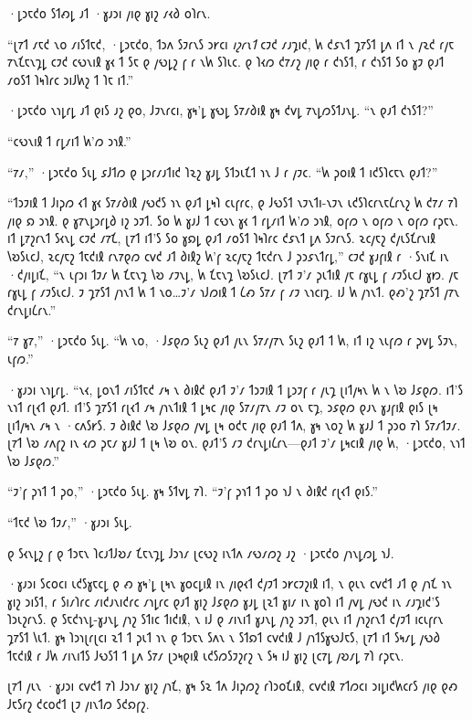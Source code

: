 ·𐑛𐑮𐑱𐑒𐑴 𐑕𐑑𐑺𐑛 𐑨𐑑 ·𐑣𐑨𐑮𐑦 𐑢𐑦𐑞 𐑣𐑦𐑟 𐑥𐑬𐑔 𐑴𐑐𐑩𐑯.

“𐑚𐑳𐑑 𐑥𐑱𐑒 𐑯𐑴 𐑥𐑦𐑕𐑑𐑱𐑒, ·𐑛𐑮𐑱𐑒𐑴, 𐑑𐑮𐑵 𐑕𐑲𐑩𐑯𐑕 𐑮𐑾𐑤𐑦 \emph{𐑦𐑟𐑩𐑯𐑑} 𐑤𐑲𐑒 𐑥𐑨𐑡𐑦𐑒, 𐑿 𐑒𐑭𐑯𐑑 𐑡𐑳𐑕𐑑 𐑛𐑵 𐑦𐑑 𐑯 𐑢𐑷𐑒 𐑩𐑢𐑱 𐑳𐑯𐑗𐑱𐑯𐑡𐑛 𐑤𐑲𐑒 𐑤𐑻𐑯𐑦𐑙 𐑣𐑬 𐑑 𐑕𐑱 𐑞 𐑢𐑻𐑛𐑟 𐑝 𐑩 𐑯𐑿 𐑕𐑐𐑧𐑤. 𐑞 𐑐𐑬𐑼 𐑒𐑳𐑥𐑟 𐑢𐑦𐑞 𐑩 𐑒𐑪𐑕𐑑, 𐑩 𐑒𐑪𐑕𐑑 𐑕𐑴 𐑣𐑲 𐑞𐑨𐑑 𐑥𐑴𐑕𐑑 𐑐𐑰𐑐𐑩𐑤 𐑮𐑦𐑓𐑿𐑟 𐑑 𐑐𐑱 𐑦𐑑.”

·𐑛𐑮𐑱𐑒𐑴 𐑯𐑪𐑛𐑩𐑛 𐑨𐑑 𐑞𐑦𐑕 𐑨𐑟 𐑞𐑴, 𐑓𐑲𐑯𐑩𐑤𐑦, 𐑣𐑰'𐑛 𐑣𐑻𐑛 𐑕𐑳𐑥𐑔𐑦𐑙 𐑣𐑰 𐑒𐑫𐑛 𐑳𐑯𐑛𐑼𐑕𐑑𐑨𐑯𐑛. “𐑯 𐑞𐑨𐑑 𐑒𐑪𐑕𐑑?”

“𐑤𐑻𐑯𐑦𐑙 𐑑 𐑩𐑛𐑥𐑦𐑑 𐑿'𐑼 𐑮𐑪𐑙.”

“𐑳𐑥,” ·𐑛𐑮𐑱𐑒𐑴 𐑕𐑧𐑛 𐑭𐑓𐑑𐑼 𐑞 𐑛𐑮𐑩𐑥𐑨𐑑𐑦𐑒 𐑐𐑷𐑟 𐑣𐑨𐑛 𐑕𐑑𐑮𐑧𐑗𐑑 𐑪𐑯 𐑓 𐑩 𐑢𐑲𐑤. “𐑿 𐑜𐑴𐑦𐑙 𐑑 𐑦𐑒𐑕𐑐𐑤𐑱𐑯 𐑞𐑨𐑑?”

“𐑑𐑮𐑲𐑦𐑙 𐑑 𐑓𐑦𐑜𐑼 𐑬𐑑 𐑣𐑬 𐑕𐑳𐑥𐑔𐑦𐑙 𐑢𐑻𐑒𐑕 𐑪𐑯 𐑞𐑨𐑑 𐑛𐑰𐑐 𐑤𐑧𐑝𐑩𐑤, 𐑞 𐑓𐑻𐑕𐑑 𐑯𐑲𐑯𐑑𐑦-𐑯𐑲𐑯 𐑧𐑒𐑕𐑐𐑤𐑩𐑯𐑱𐑖𐑩𐑯𐑟 𐑿 𐑒𐑳𐑥 𐑳𐑐 𐑢𐑦𐑞 𐑸 𐑮𐑪𐑙. 𐑞 𐑣𐑳𐑯𐑛𐑮𐑩𐑛𐑔 𐑦𐑟 𐑮𐑲𐑑. 𐑕𐑴 𐑿 𐑣𐑨𐑓 𐑑 𐑤𐑻𐑯 𐑣𐑬 𐑑 𐑩𐑛𐑥𐑦𐑑 𐑿'𐑼 𐑮𐑪𐑙, 𐑴𐑝𐑼 𐑯 𐑴𐑝𐑼 𐑯 𐑴𐑝𐑼 𐑩𐑜𐑱𐑯. 𐑦𐑑 𐑛𐑳𐑟𐑩𐑯𐑑 𐑕𐑬𐑯𐑛 𐑤𐑲𐑒 𐑥𐑳𐑗, 𐑚𐑳𐑑 𐑦𐑑'𐑕 𐑕𐑴 𐑣𐑸𐑛 𐑞𐑨𐑑 𐑥𐑴𐑕𐑑 𐑐𐑰𐑐𐑩𐑤 𐑒𐑭𐑯𐑑 𐑛𐑵 𐑕𐑲𐑩𐑯𐑕. 𐑷𐑤𐑢𐑱𐑟 𐑒𐑢𐑧𐑕𐑗𐑩𐑯𐑦𐑙 𐑘𐑹𐑕𐑧𐑤𐑓, 𐑷𐑤𐑢𐑱𐑟 𐑑𐑱𐑒𐑦𐑙 𐑩𐑯𐑳𐑞𐑼 𐑤𐑫𐑒 𐑨𐑑 𐑔𐑦𐑙𐑟 𐑿'𐑝 𐑷𐑤𐑢𐑱𐑟 𐑑𐑱𐑒𐑩𐑯 𐑓 𐑜𐑮𐑭𐑯𐑑𐑩𐑛,” 𐑤𐑲𐑒 𐑣𐑨𐑝𐑦𐑙 𐑩 ·𐑕𐑯𐑦𐑗 𐑦𐑯 ·𐑒𐑢𐑦𐑛𐑦𐑗, “𐑯 𐑧𐑝𐑮𐑦 𐑑𐑲𐑥 𐑿 𐑗𐑱𐑯𐑡 𐑘𐑹 𐑥𐑲𐑯𐑛, 𐑿 𐑗𐑱𐑯𐑡 𐑘𐑹𐑕𐑧𐑤𐑓. 𐑚𐑳𐑑 𐑲'𐑥 𐑜𐑧𐑑𐑦𐑙 𐑢𐑱 𐑩𐑣𐑧𐑛 𐑝 𐑥𐑲𐑕𐑧𐑤𐑓 𐑣𐑽. 𐑢𐑱 𐑩𐑣𐑧𐑛 𐑝 𐑥𐑲𐑕𐑧𐑤𐑓. 𐑲 𐑡𐑳𐑕𐑑 𐑢𐑪𐑯𐑑 𐑿 𐑑 𐑯𐑴…𐑲'𐑥 𐑪𐑓𐑼𐑦𐑙 𐑑 𐑖𐑺 𐑕𐑳𐑥 𐑝 𐑥𐑲 𐑯𐑪𐑤𐑦𐑡. 𐑦𐑓 𐑿 𐑢𐑪𐑯𐑑. 𐑞𐑺'𐑟 𐑡𐑳𐑕𐑑 𐑢𐑳𐑯 𐑒𐑩𐑯𐑛𐑦𐑖𐑩𐑯.”

“𐑳 𐑣𐑳,” ·𐑛𐑮𐑱𐑒𐑴 𐑕𐑧𐑛. “𐑿 𐑯𐑴, ·𐑓𐑭𐑞𐑼 𐑕𐑧𐑟 𐑞𐑨𐑑 𐑢𐑧𐑯 𐑕𐑳𐑥𐑢𐑳𐑯 𐑕𐑧𐑟 𐑞𐑨𐑑 𐑑 𐑿, 𐑦𐑑 𐑦𐑟 𐑯𐑧𐑝𐑼 𐑩 𐑜𐑫𐑛 𐑕𐑲𐑯, 𐑧𐑝𐑼.”

·𐑣𐑨𐑮𐑦 𐑯𐑪𐑛𐑩𐑛. “𐑯𐑬, 𐑛𐑴𐑯𐑑 𐑥𐑦𐑕𐑑𐑱𐑒 𐑥𐑰 𐑯 𐑔𐑦𐑙𐑒 𐑞𐑨𐑑 𐑲'𐑥 𐑑𐑮𐑲𐑦𐑙 𐑑 𐑛𐑮𐑲𐑝 𐑩 𐑢𐑧𐑡 𐑚𐑦𐑑𐑢𐑰𐑯 𐑿 𐑯 𐑘𐑹 𐑓𐑭𐑞𐑼. 𐑦𐑑'𐑕 𐑯𐑪𐑑 𐑩𐑚𐑬𐑑 𐑞𐑨𐑑. 𐑦𐑑'𐑕 𐑡𐑳𐑕𐑑 𐑩𐑚𐑬𐑑 𐑥𐑰 𐑢𐑪𐑯𐑑𐑦𐑙 𐑑 𐑛𐑰𐑤 𐑢𐑦𐑞 𐑕𐑳𐑥𐑢𐑳𐑯 𐑥𐑲 𐑴𐑯 𐑱𐑡, 𐑮𐑭𐑞𐑼 𐑞𐑨𐑯 𐑣𐑨𐑝𐑦𐑙 𐑞𐑦𐑕 𐑚𐑰 𐑚𐑦𐑑𐑢𐑰𐑯 𐑥𐑰 𐑯 ·𐑤𐑵𐑕𐑾𐑕. 𐑲 𐑔𐑦𐑙𐑒 𐑘𐑹 𐑓𐑭𐑞𐑼 𐑢𐑫𐑛 𐑚𐑰 𐑴𐑒𐑱 𐑢𐑦𐑞 𐑞𐑨𐑑 𐑑𐑵, 𐑣𐑰 𐑯𐑴𐑟 𐑿 𐑣𐑨𐑓 𐑑 𐑜𐑮𐑴 𐑳𐑐 𐑕𐑳𐑥𐑑𐑲𐑥. 𐑚𐑳𐑑 𐑘𐑹 𐑥𐑵𐑝𐑟 𐑦𐑯 𐑬𐑼 𐑜𐑱𐑥 𐑣𐑨𐑓 𐑑 𐑚𐑰 𐑘𐑹 𐑴𐑯. 𐑞𐑨𐑑'𐑕 𐑥𐑲 𐑒𐑩𐑯𐑛𐑦𐑖𐑩𐑯—𐑞𐑨𐑑 𐑲'𐑥 𐑛𐑰𐑤𐑦𐑙 𐑢𐑦𐑞 𐑿, ·𐑛𐑮𐑱𐑒𐑴, 𐑯𐑪𐑑 𐑘𐑹 𐑓𐑭𐑞𐑼.”

“𐑲'𐑝 𐑜𐑪𐑑 𐑑 𐑜𐑴,” ·𐑛𐑮𐑱𐑒𐑴 𐑕𐑧𐑛. 𐑣𐑰 𐑕𐑑𐑫𐑛 𐑳𐑐. “𐑲'𐑝 𐑜𐑪𐑑 𐑑 𐑜𐑴 𐑪𐑓 𐑯 𐑔𐑦𐑙𐑒 𐑩𐑚𐑬𐑑 𐑞𐑦𐑕.”

“𐑑𐑱𐑒 𐑘𐑹 𐑑𐑲𐑥,” ·𐑣𐑨𐑮𐑦 𐑕𐑧𐑛.

𐑞 𐑕𐑬𐑯𐑛𐑟 𐑝 𐑞 𐑑𐑮𐑱𐑯 𐑐𐑤𐑨𐑑𐑓𐑹𐑥 𐑗𐑱𐑯𐑡𐑛 𐑓𐑮𐑪𐑥 𐑚𐑤𐑻𐑟 𐑦𐑯𐑑𐑵 𐑥𐑻𐑥𐑼𐑟 𐑨𐑟 ·𐑛𐑮𐑱𐑒𐑴 𐑢𐑪𐑯𐑛𐑼𐑛 𐑪𐑓.

·𐑣𐑨𐑮𐑦 𐑕𐑤𐑴𐑤𐑦 𐑧𐑒𐑕𐑣𐑱𐑤𐑛 𐑞 𐑺 𐑣𐑰'𐑛 𐑚𐑰𐑯 𐑣𐑴𐑤𐑛𐑦𐑙 𐑦𐑯 𐑢𐑦𐑞𐑬𐑑 𐑒𐑢𐑲𐑑 𐑮𐑾𐑤𐑲𐑟𐑦𐑙 𐑦𐑑, 𐑯 𐑞𐑧𐑯 𐑤𐑫𐑒𐑑 𐑨𐑑 𐑞 𐑢𐑪𐑗 𐑪𐑯 𐑣𐑦𐑟 𐑮𐑦𐑕𐑑, 𐑩 𐑕𐑦𐑥𐑐𐑩𐑤 𐑥𐑦𐑒𐑨𐑯𐑦𐑒𐑩𐑤 𐑥𐑪𐑛𐑩𐑤 𐑞𐑨𐑑 𐑣𐑦𐑟 𐑓𐑭𐑞𐑼 𐑣𐑨𐑛 𐑚𐑷𐑑 𐑣𐑦𐑥 𐑦𐑯 𐑣𐑴𐑐 𐑦𐑑 𐑢𐑫𐑛 𐑢𐑻𐑒 𐑦𐑯 𐑥𐑨𐑡𐑦𐑒'𐑕 𐑐𐑮𐑧𐑟𐑩𐑯𐑕. 𐑞 𐑕𐑱𐑒𐑪𐑯𐑛-𐑣𐑨𐑯𐑛 𐑢𐑪𐑟 𐑕𐑑𐑦𐑤 𐑑𐑦𐑒𐑦𐑙, 𐑯 𐑦𐑓 𐑞 𐑥𐑦𐑯𐑦𐑑 𐑣𐑨𐑯𐑛 𐑢𐑪𐑟 𐑮𐑲𐑑, 𐑞𐑧𐑯 𐑦𐑑 𐑢𐑪𐑟𐑩𐑯𐑑 𐑒𐑢𐑲𐑑 𐑦𐑤𐑧𐑝𐑩𐑯 𐑡𐑳𐑕𐑑 𐑘𐑧𐑑. 𐑣𐑰 𐑐𐑮𐑪𐑚𐑩𐑚𐑤𐑦 𐑷𐑑 𐑑 𐑜𐑧𐑑 𐑪𐑯 𐑞 𐑑𐑮𐑱𐑯 𐑕𐑵𐑯 𐑯 𐑕𐑑𐑸𐑑 𐑤𐑫𐑒𐑦𐑙 𐑓 𐑢𐑪𐑑𐑕𐑣𐑻𐑓𐑱𐑕, 𐑚𐑳𐑑 𐑦𐑑 𐑕𐑰𐑥𐑛 𐑢𐑻𐑔 𐑑𐑱𐑒𐑦𐑙 𐑩 𐑓𐑿 𐑥𐑦𐑯𐑦𐑑𐑕 𐑓𐑻𐑕𐑑 𐑑 𐑛𐑵 𐑕𐑳𐑥 𐑚𐑮𐑰𐑞𐑦𐑙 𐑧𐑒𐑕𐑼𐑕𐑲𐑟𐑩𐑟 𐑯 𐑕𐑰 𐑦𐑓 𐑣𐑦𐑟 𐑚𐑤𐑳𐑛 𐑢𐑹𐑥𐑛 𐑳𐑐 𐑩𐑜𐑱𐑯.

𐑚𐑳𐑑 𐑢𐑧𐑯 ·𐑣𐑨𐑮𐑦 𐑤𐑫𐑒𐑑 𐑳𐑐 𐑓𐑮𐑪𐑥 𐑣𐑦𐑟 𐑢𐑪𐑗, 𐑣𐑰 𐑕𐑷 𐑑𐑵 𐑓𐑦𐑜𐑼𐑟 𐑩𐑐𐑮𐑴𐑗𐑦𐑙, 𐑤𐑫𐑒𐑦𐑙 𐑳𐑑𐑼𐑤𐑦 𐑮𐑦𐑛𐑦𐑒𐑿𐑤𐑩𐑕 𐑢𐑦𐑞 𐑞𐑺 𐑓𐑱𐑕𐑩𐑟 𐑒𐑤𐑴𐑒𐑑 𐑚𐑲 𐑢𐑦𐑯𐑑𐑼 𐑕𐑒𐑸𐑝𐑟.

